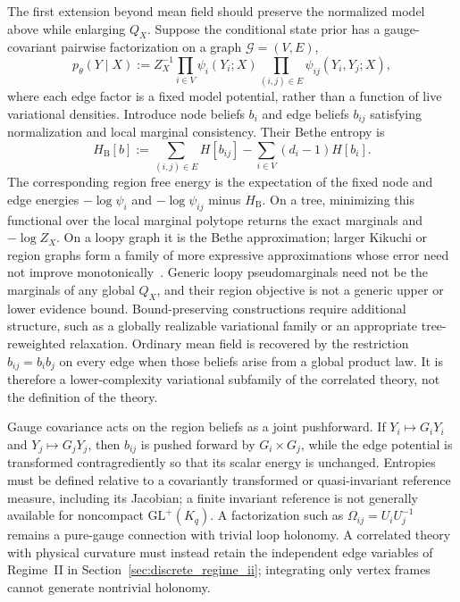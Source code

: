 \documentclass[11pt]{article}
\begin{document}
The first extension beyond mean field should preserve the normalized model above while enlarging $Q_X$. Suppose the conditional state prior has a gauge-covariant pairwise factorization on a graph $\mathcal{G}=(V,E)$,
\begin{equation}
p_\theta(Y\mid X)
:=Z_X^{-1}
\prod_{i\in V}\psi_i(Y_i;X)
\prod_{(i,j)\in E}\psi_{ij}(Y_i,Y_j;X),
\label{eq:beyond_mf_pairwise_joint}
\end{equation}
where each edge factor is a fixed model potential, rather than a function of live variational densities. Introduce node beliefs $b_i$ and edge beliefs $b_{ij}$ satisfying normalization and local marginal consistency. Their Bethe entropy is
\begin{equation}
H_{\mathrm{B}}[b]
:=\sum_{(i,j)\in E}H[b_{ij}]
-\sum_{i\in V}(d_i-1)H[b_i].
\label{eq:beyond_mf_bethe_entropy}
\end{equation}
The corresponding region free energy is the expectation of the fixed node and edge energies $-\log\psi_i$ and $-\log\psi_{ij}$ minus $H_{\mathrm{B}}$. On a tree, minimizing this functional over the local marginal polytope returns the exact marginals and $-\log Z_X$. On a loopy graph it is the Bethe approximation; larger Kikuchi or region graphs form a family of more expressive approximations whose error need not improve monotonically~\cite{Wainwright2008,Yedidia2005}. Generic loopy pseudomarginals need not be the marginals of any global $Q_X$, and their region objective is not a generic upper or lower evidence bound. Bound-preserving constructions require additional structure, such as a globally realizable variational family or an appropriate tree-reweighted relaxation. Ordinary mean field is recovered by the restriction $b_{ij}=b_i b_j$ on every edge when those beliefs arise from a global product law. It is therefore a lower-complexity variational subfamily of the correlated theory, not the definition of the theory.

Gauge covariance acts on the region beliefs as a joint pushforward. If $Y_i\mapsto G_iY_i$ and $Y_j\mapsto G_jY_j$, then $b_{ij}$ is pushed forward by $G_i\times G_j$, while the edge potential is transformed contragrediently so that its scalar energy is unchanged. Entropies must be defined relative to a covariantly transformed or quasi-invariant reference measure, including its Jacobian; a finite invariant reference is not generally available for noncompact $\mathrm{GL}^+(K_q)$. A factorization such as $\Omega_{ij}=U_iU_j^{-1}$ remains a pure-gauge connection with trivial loop holonomy. A correlated theory with physical curvature must instead retain the independent edge variables of Regime~II in Section~\ref{sec:discrete_regime_ii}; integrating only vertex frames cannot generate nontrivial holonomy.
\end{document}
